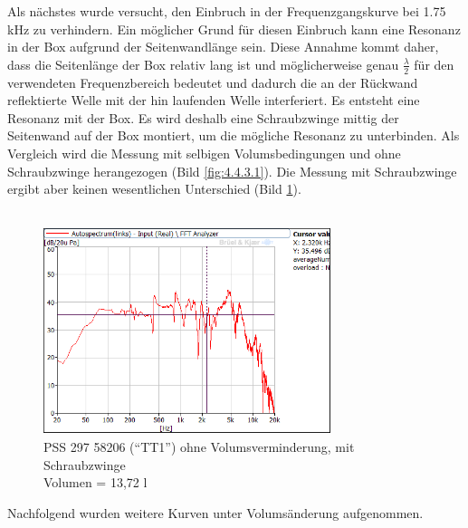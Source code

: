 \newpage
Als nächstes wurde versucht, den Einbruch in der Frequenzgangskurve bei 1.75 kHz zu verhindern.
Ein möglicher Grund für diesen Einbruch kann eine Resonanz in der Box aufgrund der Seitenwandlänge sein.
Diese Annahme kommt daher, dass die Seitenlänge der Box relativ lang ist und möglicherweise genau $\frac{\lambda}{2}$ für den verwendeten Frequenzbereich bedeutet und dadurch die an der Rückwand reflektierte Welle mit der hin laufenden Welle interferiert.
Es entsteht eine Resonanz mit der Box.
Es wird deshalb eine Schraubzwinge mittig der Seitenwand auf der Box montiert, um die mögliche Resonanz zu unterbinden.
Als Vergleich wird die Messung mit selbigen Volumsbedingungen und ohne Schraubzwinge herangezogen (Bild \ref{fig:4.4.3.1}).
Die Messung mit Schraubzwinge ergibt aber keinen wesentlichen Unterschied (Bild \ref{fig:4.4.3.3}).\\ \\

\begin{figure} [H]
	\centering
	\includegraphics[width=0.75\textwidth]{img/Optimierung/TT/TT1_ohneAllem_Schraubzwinge.png}
	\caption{PSS 297 58206 (\enquote{TT1}) ohne Volumsverminderung, mit Schraubzwinge \\Volumen = 13,72 l}
	\label{fig:4.4.3.3}
\end{figure}

\newpage
Nachfolgend wurden weitere Kurven unter Volumsänderung aufgenommen.

